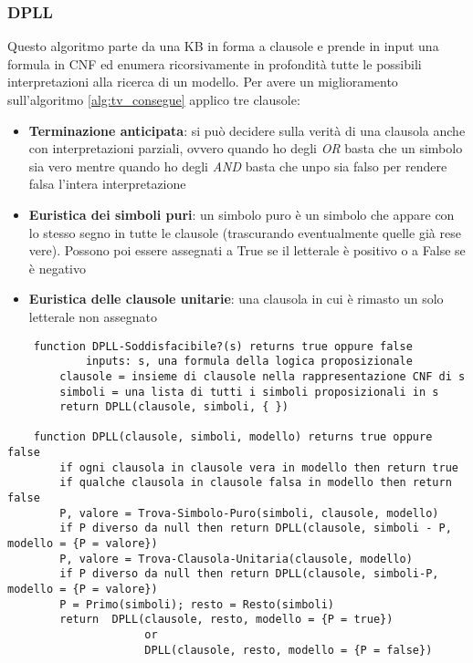 \subsubsection{DPLL}
\label{alg:dpll}
Questo algoritmo parte da una KB in forma a clausole e prende in input una formula in CNF ed enumera ricorsivamente in profondità tutte le possibili interpretazioni alla ricerca di un modello. Per avere un miglioramento sull'algoritmo \ref{alg:tv_consegue} applico tre clausole:
\begin{itemize}
	\item \textbf{Terminazione anticipata}: si può decidere sulla verità di una clausola anche con interpretazioni parziali, ovvero quando ho degli \textit{OR} basta che un simbolo sia vero mentre quando ho degli \textit{AND} basta che unpo sia falso per rendere falsa l'intera interpretazione
	\item \textbf{Euristica dei simboli puri}: un simbolo puro è un simbolo che appare con lo stesso segno in tutte le clausole (trascurando eventualmente quelle già rese vere). Possono poi essere assegnati a True se il letterale è positivo o a False se è negativo
	\item \textbf{Euristica delle clausole unitarie}: una clausola in cui è rimasto un solo letterale non assegnato
\end{itemize}

\begin{lstlisting}
	function DPLL-Soddisfacibile?(s) returns true oppure false
			inputs: s, una formula della logica proposizionale
		clausole = insieme di clausole nella rappresentazione CNF di s
		simboli = una lista di tutti i simboli proposizionali in s
		return DPLL(clausole, simboli, { })
	
	function DPLL(clausole, simboli, modello) returns true oppure false
		if ogni clausola in clausole vera in modello then return true
		if qualche clausola in clausole falsa in modello then return false
		P, valore = Trova-Simbolo-Puro(simboli, clausole, modello)
		if P diverso da null then return DPLL(clausole, simboli - P, modello = {P = valore})
		P, valore = Trova-Clausola-Unitaria(clausole, modello)
		if P diverso da null then return DPLL(clausole, simboli-P, modello = {P = valore})
		P = Primo(simboli); resto = Resto(simboli)
		return	DPLL(clausole, resto, modello = {P = true})
					 or
					 DPLL(clausole, resto, modello = {P = false})
\end{lstlisting}

